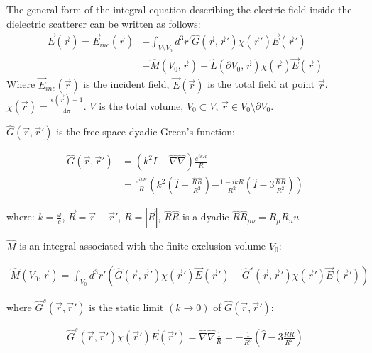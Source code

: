             The general form of the integral equation describing the electric field inside the dielectric scatterer can be written as follows:
            \begin{align}
                \vec{E}(\vec{r}) = \vec{E}_{inc}(\vec{r}) &+ \int_{V \setminus V_0}d^3r' \hat{G}(\vec{r}, \vec{r}')\chi(\vec{r}')\vec{E}(\vec{r}')\nonumber\\
                                &+ \hat{M}(V_0, \vec{r}) - \hat{L}(\partial V_0, \vec{r})\chi(\vec{r})\vec{E}(\vec{r})
            \end{align}
            Where $\vec{E}_{inc}(\vec{r})$ is the incident field, $\vec{E}(\vec{r})$ is the total field at point $\vec{r}$.
            $\chi(\vec{r}) = \frac{\epsilon(\vec{r}) - 1}{4\pi}$. $V$ is the total volume, $V_0 \subset V$, $\vec{r} \in V_0\setminus \partial V_0$.

            $\hat{G}(\vec{r}, \vec{r}')$ is the free space dyadic Green's function:

            \begin{align}
                \hat{G}(\vec{r}, \vec{r}') &= \left(k^2\hat{I}+\hat{\nabla}\hat{\nabla}\right)\frac{e^{ikR}}{R} \\
                                            &= \frac{e^{ikR}}{R}\left(k^2\left(\hat{I}-\frac{\hat{R}\hat{R}}{R^2}\right)\right.
                                                \left.-\frac{1-ikR}{R^2}\left(\hat{I} -3 \frac{\hat{R}\hat{R}}{R^2}\right)\right)
            \end{align}

            where: $k = \frac{\omega}{c}$, $\vec{R} = \vec{r} - \vec{r}'$, $R = |\vec{R}|$, $\hat{R}\hat{R}$ is a dyadic $\hat{R}\hat{R}_{\mu\nu} = R_\mu R_nu$

            $\hat{M}$ is an integral associated with the finite exclusion volume $V_0$:

            \begin{align}
                \hat{M}(V_0, \vec{r}) = \int_{V_0}d^3r'\left(\hat{G}(\vec{r}, \vec{r}')\chi(\vec{r}')\vec{E}(\vec{r}')
                                        - \hat{G}^s(\vec{r}, \vec{r}')\chi(\vec{r}')\vec{E}(\vec{r}')\right)
            \end{align}

            where $\hat{G}^s(\vec{r}, \vec{r}')$ is the static limit $(k \rightarrow 0)$ of $\hat{G}(\vec{r}, \vec{r}')$:

            \begin{align}
                \hat{G}^s(\vec{r}, \vec{r}')\chi(\vec{r}')\vec{E}(\vec{r}') = \hat{\nabla}\hat{\nabla}\frac{1}{R}
                                                    = -\frac{1}{R^3}\left(\hat{I}-3\frac{\hat{R}\hat{R}}{R^2}\right)
            \end{align}


